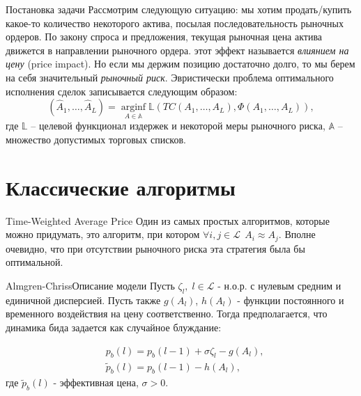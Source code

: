 \documentclass[aspectratio=169]{beamer}
\begin{document}
        \begin{frame}{Постановка задачи}
            Рассмотрим следующую ситуацию: мы хотим продать/купить какое-то количество некоторого актива, посылая последовательность рыночных ордеров.
            По закону спроса и предложения, текущая рыночная цена актива движется в направлении рыночного ордера.
            этот эффект называется \emph{влиянием на цену} (price impact). Но если мы держим позицию достаточно долго, то мы берем на себя значительный \emph{рыночный риск}.
            Эвристически проблема оптимального исполнения сделок записывается следующим образом:
            \begin{equation*}
                (\hat A_1, \dots, \hat A_L) = \operatorname*{arginf}_{A\in\mathbb{A}} \mathbb{L} (TC(A_1, \dots, A_L), \Phi(A_1, \dots, A_L)),
            \end{equation*}
            где $\mathbb{L}$ -- целевой функционал издержек и некоторой меры рыночного риска,
                $\mathbb{A}$ -- множество допустимых торговых списков.
        \end{frame}

    
    \section{Классические алгоритмы}
        \begin{frame}{Time-Weighted Average Price}
            Один из самых простых алгоритмов, которые можно придумать, это алгоритм, при котором $\forall i, j \in \mathcal L \ \ A_i \approx A_j$. 
            Вполне очевидно, что при отсутствии рыночного риска эта стратегия была бы оптимальной.
        \end{frame}

        \begin{frame}{Almgren-Chriss}{Описание модели}
            Пусть $\zeta_l, \; l \in \mathcal L$ - н.о.р. с нулевым средним и единичной дисперсией. Пусть также $g(A_l)$, $h(A_l)$ - функции постоянного и временного воздействия на цену соответственно. Тогда предполагается, что динамика бида задается как случайное блуждание:
            
            \begin{align*}
                &p_b(l) = p_b(l - 1) + \sigma \zeta_l - g(A_l), \\
                &\tilde p_b(l) = p_b(l - 1) - h(A_l),
            \end{align*}
            где $\tilde p_b(l)$ - эффективная цена, $\sigma > 0$.

        \end{frame}
\end{document}
